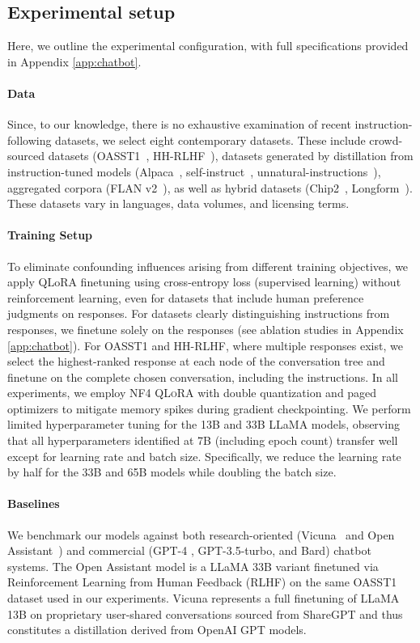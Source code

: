 \subsection{Experimental setup} Here, we outline the experimental configuration, with full specifications provided in Appendix \ref{app:chatbot}.

\paragraph{Data} Since, to our knowledge, there is no exhaustive examination of recent instruction-following datasets, we select eight contemporary datasets. These include crowd-sourced datasets (OASST1~\citep{kopf2023openassistant}, HH-RLHF~\citep{bai2022training}), datasets generated by distillation from instruction-tuned models (Alpaca~\citep{alpaca}, self-instruct~\citep{wang2022self}, unnatural-instructions~\citep{honovich2022unnatural}), aggregated corpora (FLAN v2~\citep{chung2022scaling}), as well as hybrid datasets (Chip2~\citep{laion2023}, Longform~\citep{koksal2023longform}). These datasets vary in languages, data volumes, and licensing terms.

\paragraph{Training Setup} To eliminate confounding influences arising from different training objectives, we apply QLoRA finetuning using cross-entropy loss (supervised learning) without reinforcement learning, even for datasets that include human preference judgments on responses. For datasets clearly distinguishing instructions from responses, we finetune solely on the responses (see ablation studies in Appendix \ref{app:chatbot}). For OASST1 and HH-RLHF, where multiple responses exist, we select the highest-ranked response at each node of the conversation tree and finetune on the complete chosen conversation, including the instructions. In all experiments, we employ NF4 \textsc{QLoRA} with double quantization and paged optimizers to mitigate memory spikes during gradient checkpointing. We perform limited hyperparameter tuning for the 13B and 33B LLaMA models, observing that all hyperparameters identified at 7B (including epoch count) transfer well except for learning rate and batch size. Specifically, we reduce the learning rate by half for the 33B and 65B models while doubling the batch size.

\paragraph{Baselines} We benchmark our models against both research-oriented (Vicuna~\citep{vicuna2023} and Open Assistant~\citep{kopf2023openassistant}) and commercial (GPT-4 \citep{openai2023gpt}, GPT-3.5-turbo, and Bard) chatbot systems. The Open Assistant model is a LLaMA 33B variant finetuned via Reinforcement Learning from Human Feedback (RLHF) on the same OASST1 dataset used in our experiments. Vicuna represents a full finetuning of LLaMA 13B on proprietary user-shared conversations sourced from ShareGPT and thus constitutes a distillation derived from OpenAI GPT models.

